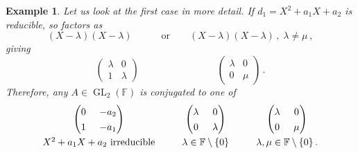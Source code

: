 \documentclass{article}
\theoremstyle{plain}\theoremheaderfont{\normalfont\itshape}\theorembodyfont{\rmfamily}\theoremseparator{.}\newtheorem*{rem}{Remark}\newtheorem*{ex}{Example}\newtheorem*{proof}{Proof}\newtheorem*{altp}{Alternative proof}\newtheorem*{nonex}{Non-Example}
\theoremstyle{plain}\theoremheaderfont{\normalfont\bfseries}\theorembodyfont{\rmfamily}\theoremseparator{.}\newtheorem{thm}{Theorem}[section]\newtheorem{lem}[thm]{Lemma}\newtheorem{prop}[thm]{Proposition}\newtheorem*{cor}{Corollary}\newtheorem{defn}[thm]{Definition}\newtheorem{clm}[thm]{Claim}\newtheorem{clminproof}{Claim}\newtheorem*{notn}{Notation}\newtheorem*{exer}{Exercise}\newtheorem*{lemnn}{Lemma}
\theoremstyle{break}\theoremheaderfont{\normalfont\itshape}\theorembodyfont{\rmfamily}\theoremseparator{.\medskip}\newtheorem*{proofskip}{Proof}\newtheorem*{exs}{Examples}\newtheorem*{rems}{Remarks}\newtheorem*{obs}{Observations}
\theoremstyle{break}\theoremheaderfont{\normalfont\bfseries}\theorembodyfont{\rmfamily}\theoremseparator{.\medskip}\newtheorem{lemskip}[thm]{Lemma}\newtheorem{defnskip}[thm]{Definition}\newtheorem{propskip}[thm]{Proposition}\newtheorem{thmskip}[thm]{Theorem}
\numberwithin{equation}{section}
\DeclareMathOperator{\GL}{GL}
\newcommand{\FF}{\mathbb{F}}
\begin{document}
\begin{ex}
        Let us look at the first case in more detail. If \(d_1=X^2+a_1X+a_2\) is reducible, so factors as
        \[(X-\lambda)(X-\lambda)\qquad\quad\text{or}\qquad(X-\lambda)(X-\lambda)\,,\;\lambda\ne\mu\,,\]
        giving
        \[\begin{pmatrix}
            \lambda & 0\\
            1 & \lambda
        \end{pmatrix}\qquad\qquad\qquad\qquad\begin{pmatrix}
            \lambda & 0\\
            0 & \mu
        \end{pmatrix}\,.\]
        Therefore, any \(A\in\GL_2(\FF)\) is conjugated to one of
        \[\def\arraystretch{1.3}\arraycolsep=7pt
        \begin{array}{ccccc}
            \begin{pmatrix}
                0 & -a_2\\
                1 & -a_1
            \end{pmatrix}  & & \begin{pmatrix}
                \lambda & 0\\
                0 & \lambda
            \end{pmatrix} & & \begin{pmatrix}
                \lambda & 0\\
                0 & \mu
            \end{pmatrix} \\
            X^2+a_1X+a_2\text{ irreducible} & & \lambda\in\FF\setminus\{0\} & & \lambda,\mu\in\FF\setminus\{0\}\,.
        \end{array}
        \]
    \end{ex}
\end{document}
